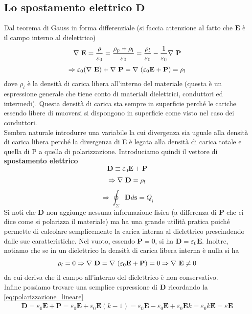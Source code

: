 \documentclass[
10pt, %
a4paper, %
oneside, %
headinclude,footinclude, %
BCOR5mm, %
]{scrartcl}
\begin{document}
\subsection{Lo spostamento elettrico $\mathbf{D}$}
Dal teorema di Gauss in forma differenziale (si faccia attenzione al fatto che $\mathbf{E}$ è il campo interno al dielettrico)
\[\mathbf{\nabla\ }\mathbf{E} = \frac{\rho}{\varepsilon_0} = \frac{\rho_p + \rho_l}{\varepsilon_0} = \frac{\rho_l}{\varepsilon_0}-\frac{1}{\varepsilon_0}\mathbf{\nabla\ }\mathbf{P}\]
\[\Rightarrow \varepsilon_0(\mathbf{\nabla\ }\mathbf{E})+\mathbf{\nabla\ }\mathbf{P} = \mathbf{\nabla\ }(\varepsilon_0\mathbf{E}+\mathbf{P})= \rho_l\]
dove $\rho_l$ è la densità di carica libera all'interno del materiale (questa è un espressione generale che tiene conto di materiali dielettrici, conduttori ed intermedi). Questa densità di carica sta sempre in superficie perché le cariche essendo libere di muoversi si dispongono in superficie come visto nel caso dei conduttori.\\
Sembra naturale introdurre una variabile la cui divergenza sia uguale alla densità di carica libera perché la divergenza di E è legata alla densità di carica totale e quella di P a quella di polarizzazione. Introduciamo quindi il vettore di \textbf{spostamento elettrico}
\[\mathbf{D} \equiv \varepsilon_0\mathbf{E}+\mathbf{P}\]
\[\Rightarrow \mathbf{\nabla\ }\mathbf{D} =\rho_l\]
\[\Rightarrow \oint_\Sigma\mathbf{D}d\mathbf{s} = Q_l\]
Si noti che $\mathbf{D}$ non aggiunge nessuna informazione fisica (a differenza di $\mathbf{P}$ che ci dice come si polarizza il materiale) ma ha una grande utilità pratica poiché permette di calcolare semplicemente la carica interna al dielettrico prescindendo dalle sue caratteristiche. Nel vuoto, essendo $\mathbf{P} = 0$, si ha $\mathbf{D} = \varepsilon_0\mathbf{E}$. Inoltre, notiamo che se in un dielettrico la densità di carica libera interna è nulla si ha
\[\rho_l = 0 \Rightarrow \mathbf{\nabla\ }\mathbf{D} =\mathbf{\nabla\ }(\varepsilon_0\mathbf{E}+\mathbf{P}) = 0 \Rightarrow \mathbf{\nabla\ }\mathbf{E}\neq 0\]
da cui deriva che il campo all'interno del dielettrico è non conservativo.\\
Infine possiamo trovare una semplice espressione di $\mathbf{D}$ ricordando la \ref{eq:polarizzazione_lineare}
\begin{align}\label{eq:spostamento_elettrico}
\mathbf{D} = \varepsilon_0\mathbf{E}+\mathbf{P} = \varepsilon_0\mathbf{E}+ \varepsilon_0 \mathbf{E}(k-1)=  \varepsilon_0\mathbf{E}- \varepsilon_0 \mathbf{E}+\varepsilon_0 \mathbf{E}k=\varepsilon_0 k\mathbf{E} = \varepsilon \mathbf{E}
\end{align}
\end{document}
